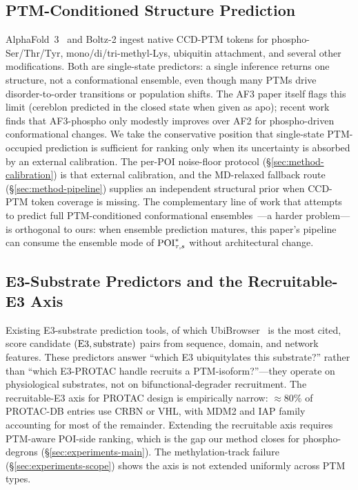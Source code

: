 \subsection{PTM-Conditioned Structure Prediction}
\label{sec:related-structure}

AlphaFold~3~\cite{af3-2024} and Boltz-2 ingest native CCD-PTM tokens for phospho-Ser/Thr/Tyr, mono/di/tri-methyl-Lys, ubiquitin attachment, and several other modifications. Both are single-state predictors: a single inference returns one structure, not a conformational ensemble, even though many PTMs drive disorder-to-order transitions or population shifts. The AF3 paper itself flags this limit (cereblon predicted in the closed state when given as apo); recent work~\cite{bouvier-2025} finds that AF3-phospho only modestly improves over AF2 for phospho-driven conformational changes. We take the conservative position that single-state PTM-occupied prediction is sufficient for ranking only when its uncertainty is absorbed by an external calibration. The per-POI noise-floor protocol (\S\ref{sec:method-calibration}) is that external calibration, and the MD-relaxed fallback route (\S\ref{sec:method-pipeline}) supplies an independent structural prior when CCD-PTM token coverage is missing. The complementary line of work that attempts to predict full PTM-conditioned conformational ensembles~\cite{af3-2024}---a harder problem---is orthogonal to ours: when ensemble prediction matures, this paper's pipeline can consume the ensemble mode of $\mathrm{POI}^{*}_{\tau,s}$ without architectural change.

\subsection{E3-Substrate Predictors and the Recruitable-E3 Axis}
\label{sec:related-e3}

Existing E3-substrate prediction tools, of which UbiBrowser~\cite{ubibrowser-2017} is the most cited, score candidate $(\mathrm{E3}, \mathrm{substrate})$ pairs from sequence, domain, and network features. These predictors answer ``which E3 ubiquitylates this substrate?'' rather than ``which E3-PROTAC handle recruits a PTM-isoform?''---they operate on physiological substrates, not on bifunctional-degrader recruitment. The recruitable-E3 axis for PROTAC design is empirically narrow: $\approx 80\%$ of PROTAC-DB entries use CRBN or VHL, with MDM2 and IAP family accounting for most of the remainder. Extending the recruitable axis requires PTM-aware POI-side ranking, which is the gap our method closes for phospho-degrons (\S\ref{sec:experiments-main}). The methylation-track failure (\S\ref{sec:experiments-scope}) shows the axis is not extended uniformly across PTM types.

